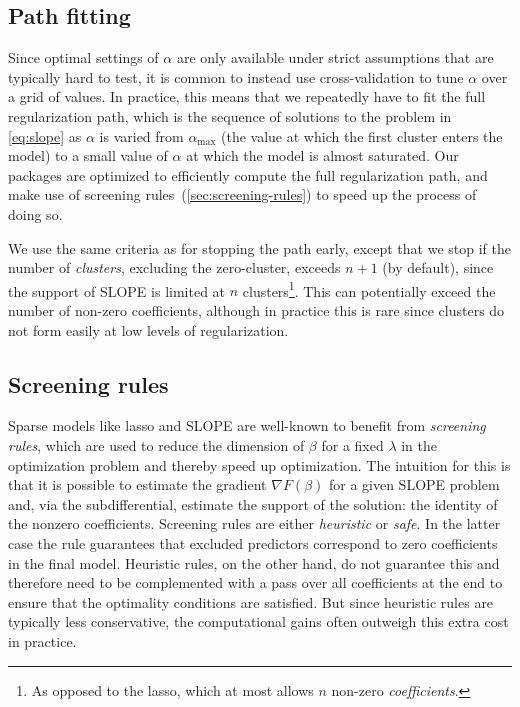 \documentclass[a4paper,fleqn]{cas-sc}
\begin{document}
\subsection{Path fitting}

Since optimal settings of \(\alpha\) are only available under strict assumptions
that are typically hard to test, it is common to instead use cross-validation to
tune \(\alpha\) over a grid of values. In practice, this means that we
repeatedly have to fit the full regularization path, which is the sequence of
solutions to the problem in \autoref{eq:slope} as \(\alpha\) is varied from
\(\alpha_\text{max}\) (the value at which the first cluster enters the model) to
a small value of \(\alpha\) at which the model is almost saturated. Our packages
are optimized to efficiently compute the full regularization path, and make use
of screening rules~(\autoref{sec:screening-rules}) to speed up the process of
doing so.

We use the same criteria as \citet{friedman2010} for stopping the path early,
except that we stop if the number of \emph{clusters}, excluding the
zero-cluster, exceeds \(n + 1\) (by default), since the support of SLOPE is
limited at \(n\) clusters\footnote{As opposed to the lasso, which at most allows
\(n\) non-zero \emph{coefficients}.}. This can potentially exceed the number of
non-zero coefficients, although in practice this is rare since clusters do not
form easily at low levels of regularization.

\subsection{Screening rules}
\label{sec:screening-rules}

Sparse models like lasso and SLOPE are well-known to benefit from
\emph{screening rules}, which are used to reduce the dimension of \(\beta\) for
a fixed \(\lambda\) in the optimization problem and thereby speed up
optimization. The intuition for this is that it is possible to estimate the
gradient \(\nabla F(\beta)\) for a given SLOPE problem and, via the
subdifferential, estimate the support of the solution: the identity of the
nonzero coefficients. Screening rules are either \emph{heuristic} or
\emph{safe}. In the latter case the rule guarantees that excluded predictors
correspond to zero coefficients in the final model. Heuristic rules, on the
other hand, do not guarantee this and therefore need to be complemented with a
pass over all coefficients at the end to ensure that the optimality conditions
are satisfied. But since heuristic rules are typically less conservative, the
computational gains often outweigh this extra cost in practice.
\end{document}

